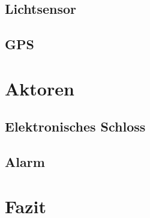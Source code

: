 \documentclass{sigchi}
\begin{document}
\subsection{Lichtsensor}

\subsection{GPS}

\section{Aktoren}

\subsection{Elektronisches Schloss}

\subsection{Alarm}

\section{Fazit}

\balance{}



\end{document}
